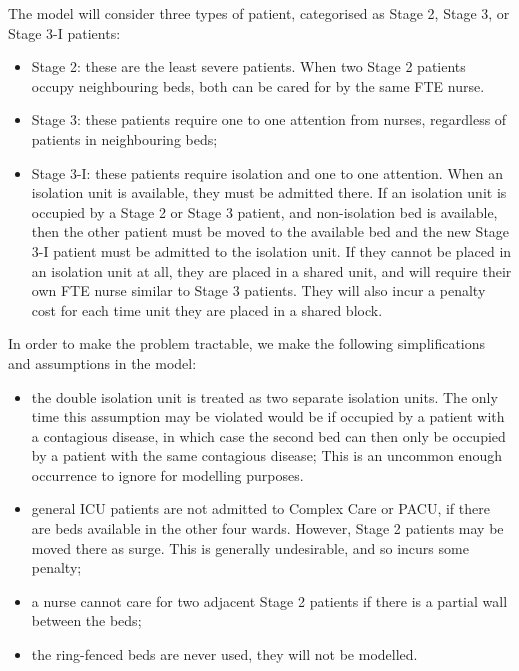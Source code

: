 \documentclass{article}
\begin{document}
The model will consider three types of patient, categorised as Stage 2, Stage 3,
or Stage 3-I patients:
\begin{itemize}
  \item Stage 2: these are the least severe patients.
        When two Stage 2 patients occupy neighbouring beds, both can be cared
        for by the same FTE nurse.
  \item Stage 3: these patients require one to one attention from nurses,
        regardless of patients in neighbouring beds;
  \item Stage 3-I: these patients require isolation and one to one attention.
        When an isolation unit is available, they must be admitted there.
        If an isolation unit is occupied by a Stage 2 or Stage 3 patient, and
        non-isolation bed is available, then the other patient must be moved to
        the available bed and the new Stage 3-I patient must be admitted to the
        isolation unit.
        If they cannot be placed in an isolation unit at all, they are placed in
        a shared unit, and will require their own FTE nurse similar to Stage 3
        patients.
        They will also incur a penalty cost for each time unit they are placed
        in a shared block.
\end{itemize}

In order to make the problem tractable, we make the following simplifications
and assumptions in the model:

\begin{itemize}
  \item the double isolation unit is treated as two separate isolation units.
  The only time this assumption may be violated would be if occupied by a
  patient with a contagious disease, in which case the second bed can then only
  be occupied by a patient with the same contagious disease;
  This is an uncommon enough occurrence to ignore for modelling purposes.
  \item general ICU patients are not admitted to Complex Care or PACU, if there
  are beds available in the other four wards.
  However, Stage 2 patients may be moved there as surge.
  This is generally undesirable, and so incurs some penalty;
  \item a nurse cannot care for two adjacent Stage 2 patients if there is a
  partial wall between the beds;
  \item the ring-fenced beds are never used, they will not be modelled.
\end{itemize}
\end{document}
